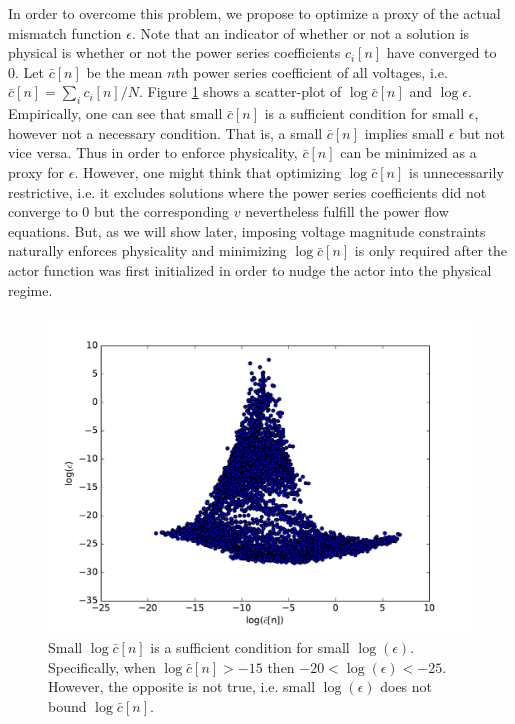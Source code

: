 In order to overcome this problem, we propose to optimize a proxy of the actual mismatch function $\epsilon$. Note that an indicator of whether or not a solution is physical is whether or not the power series coefficients $c_i[n]$ have converged to 0. Let $\bar{c}[n]$ be the mean $n$th power series coefficient of all voltages, i.e. $\bar{c}[n] = \sum_i c_i[n]/N$. Figure \ref{fig:ceps} shows a scatter-plot of $\log \bar{c}[n]$ and $\log \epsilon$. Empirically, one can see that small $\bar{c}[n]$ is a sufficient condition for small $\epsilon$, however not a necessary condition. That is, a small $\bar{c}[n]$ implies small $\epsilon$ but not vice versa. Thus in order to enforce physicality, $\bar{c}[n]$ can be minimized as a proxy for $ \epsilon$. However, one might think that optimizing $\log \bar{c}[n]$ is unnecessarily restrictive, i.e. it excludes solutions where the power series coefficients did not converge to 0 but the corresponding $v$ nevertheless fulfill the power flow equations. But, as we will show later, imposing voltage magnitude constraints naturally enforces physicality and minimizing $\log \bar{c}[n]$ is only required after the actor function was first initialized in order to nudge the actor into the physical regime.


\begin{figure}
\includegraphics[width=\linewidth]{krtofl/ceps.pdf}
\caption[LOPF: Small power series coeffients imply small error.]{Small $\log \bar{c}[n]$ is a sufficient condition for small $\log(\epsilon)$. Specifically, when $\log \bar{c}[n] > -15$ then $-20 < \log(\epsilon) < -25$. However, the opposite is not true, i.e. small $\log(\epsilon)$ does not bound $\log \bar{c}[n]$.}
\label{fig:ceps}
\end{figure}

